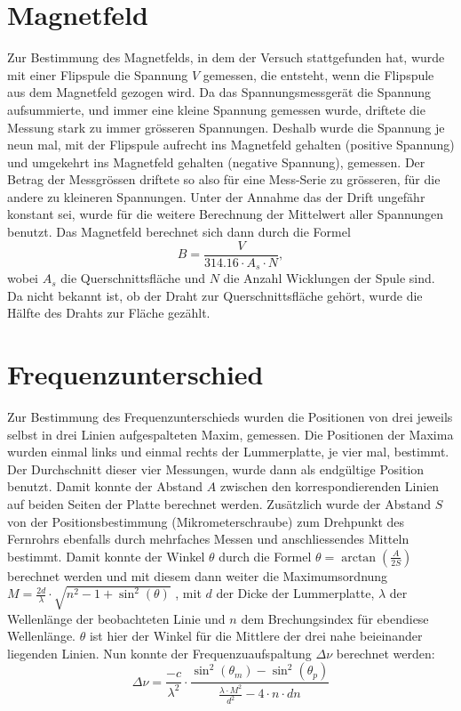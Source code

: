 \documentclass[a4paper,parskip,11pt, DIV12]{scrreprt}
\begin{document}
	\section{Magnetfeld}
	
	Zur Bestimmung des Magnetfelds, in dem der Versuch stattgefunden hat, wurde mit einer Flipspule die Spannung $V$ gemessen, die entsteht, wenn die Flipspule aus dem Magnetfeld gezogen wird. Da das Spannungsmessgerät die Spannung aufsummierte, und immer eine kleine Spannung gemessen wurde, driftete die Messung stark zu immer grösseren Spannungen. Deshalb wurde die Spannung je neun mal, mit der Flipspule aufrecht ins Magnetfeld gehalten (positive Spannung) und umgekehrt ins Magnetfeld gehalten (negative Spannung), gemessen. Der Betrag der Messgrössen driftete so also für eine Mess-Serie zu grösseren, für die andere zu kleineren Spannungen. Unter der Annahme das der Drift ungefähr konstant sei, wurde für die weitere Berechnung der Mittelwert aller Spannungen benutzt.   
	Das Magnetfeld berechnet sich dann durch die Formel
	\begin{equation}
	\label{B-Feld}
	B = \frac{V}{314.16 \cdot A_s \cdot N} ,
	\end{equation}
	wobei $A_s$ die Querschnittsfläche und $N$ die Anzahl Wicklungen der Spule sind. Da nicht bekannt ist, ob der Draht zur Querschnittsfläche gehört, wurde die Hälfte des Drahts zur Fläche gezählt. 
	
	\section{Frequenzunterschied}
	
	Zur Bestimmung des Frequenzunterschieds wurden die Positionen von drei jeweils selbst in drei Linien aufgespalteten Maxim, gemessen. Die Positionen der Maxima wurden einmal links und einmal rechts der Lummerplatte, je vier mal, bestimmt. Der Durchschnitt dieser vier Messungen, wurde dann als endgültige Position benutzt. Damit konnte der Abstand $A$ zwischen den korrespondierenden Linien auf beiden Seiten der Platte berechnet werden. Zusätzlich wurde der Abstand $S$ von der Positionsbestimmung (Mikrometerschraube) zum Drehpunkt des Fernrohrs ebenfalls durch mehrfaches Messen und anschliessendes Mitteln bestimmt. 
Damit konnte der Winkel $\theta$ durch die Formel $\theta = \arctan(\frac{A}{2 S})$ berechnet werden und mit diesem dann weiter die Maximumsordnung  $M = \frac{2d}{\lambda} \cdot \sqrt{n^2-1+\sin^2(\theta)}$ , mit $d$ der Dicke der Lummerplatte, $\lambda$ der Wellenlänge der beobachteten Linie und $n$ dem Brechungsindex für ebendiese Wellenlänge. $\theta$ ist hier der Winkel für die Mittlere der drei nahe beieinander liegenden Linien. 
Nun konnte der Frequenzuaufspaltung $\Delta \nu$ berechnet werden:
	\begin{equation}
	\label{Frequenzunterschied}
	\Delta \nu = \frac{-c}{\lambda^2}\cdot\frac{\sin^2(\theta_m)-\sin^2(\theta_p)}{\frac{\lambda \cdot M^2}{d^2}-4\cdot n \cdot dn}
	\end{equation}
	
\end{document}
